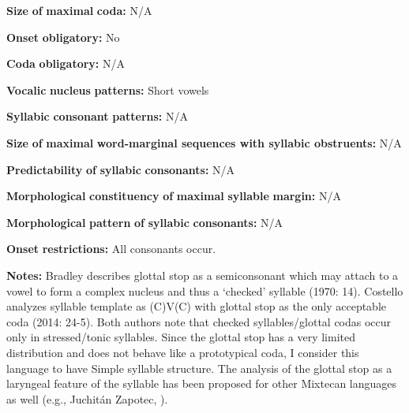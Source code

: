 \documentclass[output=paper]{langsci/langscibook}
\begin{document}
\begin{styleBody}
\textbf{Size} \textbf{of} \textbf{maximal} \textbf{coda:} N/A
\end{styleBody}

\begin{styleBody}
\textbf{Onset} \textbf{obligatory:} No
\end{styleBody}

\begin{styleBody}
\textbf{Coda} \textbf{obligatory:} N/A
\end{styleBody}

\begin{styleBody}
\textbf{Vocalic} \textbf{nucleus} \textbf{patterns:} Short vowels
\end{styleBody}

\begin{styleBody}
\textbf{Syllabic} \textbf{consonant} \textbf{patterns:} N/A
\end{styleBody}

\begin{styleBody}
\textbf{Size} \textbf{of} \textbf{maximal} \textbf{word{}-marginal sequences with syllabic obstruents:} N/A
\end{styleBody}

\begin{styleBody}
\textbf{Predictability} \textbf{of} \textbf{syllabic} \textbf{consonants:} N/A
\end{styleBody}

\begin{styleBody}
\textbf{Morphological} \textbf{constituency} \textbf{of} \textbf{maximal} \textbf{syllable} \textbf{margin:} N/A
\end{styleBody}

\begin{styleBody}
\textbf{Morphological} \textbf{pattern} \textbf{of} \textbf{syllabic} \textbf{consonants:} N/A
\end{styleBody}

\begin{styleBody}
\textbf{Onset} \textbf{restrictions:} All consonants occur.
\end{styleBody}

\begin{styleBody}
\textbf{Notes:} Bradley describes glottal stop as a semiconsonant which may attach to a vowel to form a complex nucleus and thus a ‘checked’ syllable (1970: 14). Costello analyzes syllable template as (C)V(C) with glottal stop as the only acceptable coda (2014: 24-5). Both authors note that checked syllables/glottal codas occur only in stressed/tonic syllables. Since the glottal stop has a very limited distribution and does not behave like a prototypical coda, I consider this language to have Simple syllable structure. The analysis of the glottal stop as a laryngeal feature of the syllable has been proposed for other Mixtecan languages as well (e.g., Juchitán Zapotec, \citealt{MarlettPickett1987}).
\end{styleBody}
\end{document}
